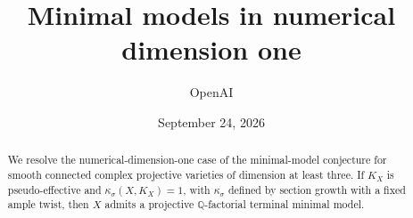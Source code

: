 \documentclass[11pt]{amsart}
\title{Minimal models in numerical dimension one}
\author{OpenAI}
\date{September 24, 2026}
\numberwithin{equation}{section}
\theoremstyle{definition}
\theoremstyle{remark}
\begin{document}
\begin{abstract}
We resolve the numerical-dimension-one case of the minimal-model conjecture
for smooth connected complex projective varieties of dimension at least three.
If $K_X$ is pseudo-effective and $\kappa_\sigma(X,K_X)=1$, with
$\kappa_\sigma$ defined by section growth with a fixed ample twist, then $X$
admits a projective $\mathbb Q$-factorial terminal minimal model.
\end{abstract}
\maketitle






\end{document}
